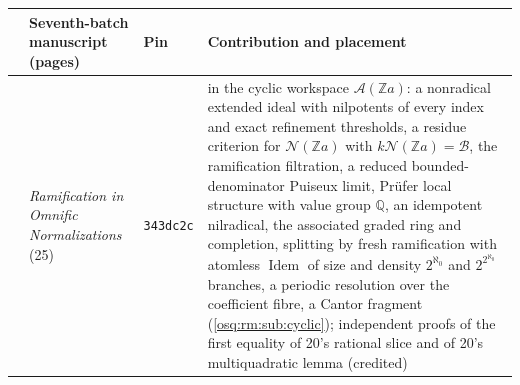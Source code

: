 \documentclass[11pt,letterpaper]{article}
\numberwithin{equation}{section}
\theoremstyle{definition}
\theoremstyle{remark}
\theoremstyle{plain}
\newcommand{\Z}{\mathbb Z}
\newcommand{\Q}{\mathbb Q}
\newcommand{\A}{\mathcal A}          %
\newcommand{\NN}{\mathcal N}         %
\newcommand{\Idem}{\operatorname{Idem}}
\begin{document}
\begin{center}\small
\begin{tabular}{@{}>{\raggedright\arraybackslash}p{}>{\raggedright\arraybackslash}p{}>{\raggedright\arraybackslash}p{}>{\raggedright\arraybackslash}p{}@{}}
\toprule
& Seventh-batch manuscript (pages) & Pin & Contribution and placement\\
\midrule
23 & \emph{Ramification in Omnific Normalizations} (25) & \texttt{343dc2c} & in the cyclic workspace $\A(\Z a)$: a nonradical extended ideal with nilpotents of every index and exact refinement thresholds, a residue criterion for $\NN(\Z a)$ with $k\NN(\Z a)=\mathscr B$, the ramification filtration, a reduced bounded-denominator Puiseux limit, Pr\"ufer local structure with value group $\Q$, an idempotent nilradical, the associated graded ring and completion, splitting by fresh ramification with atomless $\Idem$ of size and density $2^{\aleph_0}$ and $2^{2^{\aleph_0}}$ branches, a periodic resolution over the coefficient fibre, a Cantor fragment (\cref{osq:rm:sub:cyclic}); independent proofs of the first equality of 20's rational slice and of 20's multiquadratic lemma (credited)\\
\bottomrule
\end{tabular}
\end{center}
\end{document}
